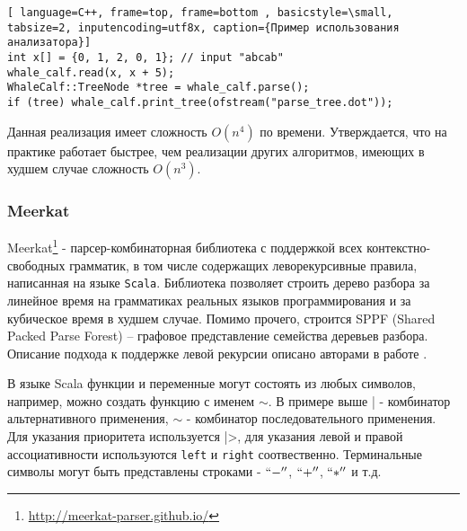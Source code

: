 \begin{lstlisting}[ language=C++, frame=top, frame=bottom , basicstyle=\small, tabsize=2, inputencoding=utf8x, caption={Пример использования анализатора}]
int x[] = {0, 1, 2, 0, 1}; // input "abcab"
whale_calf.read(x, x + 5);
WhaleCalf::TreeNode *tree = whale_calf.parse();
if (tree) whale_calf.print_tree(ofstream("parse_tree.dot"));
\end{lstlisting}

Данная реализация имеет сложность $O(n^{4})$ по времени. Утверждается, что на практике работает быстрее, чем реализации других алгоритмов, имеющих в худшем случае сложность $O(n^{3})$.


\subsubsection{Meerkat}
Meerkat\footnote{\url{http://meerkat-parser.github.io/}} - парсер-комбинаторная библиотека с поддержкой всех контекстно-свободных грамматик, в том числе содержащих леворекурсивные правила, написанная на языке {\tt Scala}. Библиотека позволяет строить дерево разбора за линейное время на грамматиках реальных языков программирования и за кубическое время в худшем случае. Помимо прочего, строится SPPF (Shared Packed Parse Forest) -- графовое представление семейства деревьев разбора. Описание подхода к поддержке левой рекурсии описано авторами в работе \cite{izmaylova2016practical}.

В языке Scala функции и переменные могут состоять из любых символов, например, можно создать функцию с именем $\sim$. В примере выше | - комбинатор альтернативного применения, $\sim$ - комбинатор последовательного применения. Для указания приоритета используется |>, для указания левой и правой ассоциативности используются \lstinline[language=Scala]{left} и \lstinline[language=Scala]{right} соотвественно. Терминальные символы могут быть представлены строками - $``-''$, $``+''$, $``*''$ и т.д.

